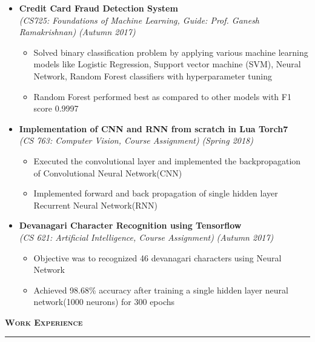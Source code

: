 \documentclass[a4paper,10pt]{article}
\newcommand{\isep}{-2 pt}
\newcommand{\lsep}{-0.5cm}
\newcommand{\resheading}[1]{{\small
        {
            \begin{minipage}
                {0.992\textwidth}\textbf{{\textsc{#1 \vphantom{p\^{E}} }}}
                \\[-0.3cm]
                \hrule
            \end{minipage}
            \\[-0.5cm]
        }
 }}
\begin{document}
\begin{itemize}
\item \textbf{Credit Card Fraud Detection System}\\ {\emph{(CS725: Foundations of Machine Learning, Guide: Prof. Ganesh Ramakrishnan)}} \hfill {\emph{(Autumn 2017)}}
\\[-0.6cm]
    \begin{itemize}\itemsep \isep
        \item Solved binary classification problem by applying various machine learning models like Logistic Regression, Support vector machine (SVM), Neural Network, Random Forest classifiers with hyperparameter tuning
		\item Random Forest performed best as compared to other models with F1 score 0.9997 
    \end{itemize}
\pagebreak
\item \textbf{Implementation of CNN and RNN from scratch in Lua Torch7} \\
    {\emph{(CS 763: Computer Vision, Course Assignment)}} \hfill {\emph{(Spring 2018)}}
    \\ [-0.6cm]
    \begin{itemize}\itemsep \isep
    \item Executed the convolutional layer and implemented the backpropagation of Convolutional Neural Network(CNN)
    \item Implemented forward and back propagation of single hidden layer Recurrent Neural Network(RNN)
	\end{itemize}
\vspace{-0.2cm}
\item \textbf{Devanagari Character Recognition using Tensorflow} \\ {\emph{(CS 621: Artificial Intelligence, Course Assignment)}} \hfill {\emph{(Autumn 2017)}}
    \\ [-0.6cm]
    \begin{itemize}\itemsep \isep
    \item Objective was to recognized 46 devanagari characters using Neural Network
    \item Achieved 98.68\% accuracy after training a single hidden layer neural network(1000 neurons) for 300 epochs
    \end{itemize}


\end{itemize}
 \vspace{0.05cm}
\resheading{\textbf{\large Work Experience}}\\[\lsep]
\\[-0.38cm]
\end{document}
